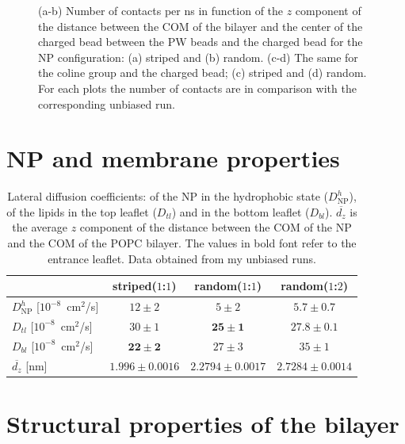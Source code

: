 \begin{figure}[p]
{	}
	\caption{(a-b) Number of contacts per ns in function of the $z$ component of the distance between the \acs{COM} of the bilayer and the center of the charged bead between the \acs{PW} beads and the charged bead for the \acs{NP} configuration: (a) striped and (b) random. (c-d) The same for the coline group and the charged bead; (c) striped and (d) random. For each plots the number of contacts are in comparison with the corresponding unbiased run.}
\end{figure}


\section{NP and membrane properties}

\begin{table}[h!t]
	\centering
	\begin{tabular}{lccc}
		\toprule
		\,		 & striped($1$:$1$)		& random($1$:$1$)		& random($1$:$2$)					\\ \toprule
		$D^h_{\text{NP}}$ [$10^{-8}$~cm$^2$/s] & $12 \pm 2$ & $5 \pm 2$ & $5.7 \pm 0.7$ 				\\ \midrule
		$D_{tl}$ [$10^{-8}$~cm$^2$/s] & $30 \pm 1$ & $\mathbf{25 \pm 1}$ & $\mathbf{27.8 \pm 0.1}$	\\ \midrule
		$D_{bl}$ [$10^{-8}$~cm$^2$/s] & $\mathbf{22 \pm 2}$ & $27 \pm 3$	& $35 \pm 1$			\\ \midrule
		$\overline{d_z}$ [nm] & $1.996 \pm 0.0016$	& $2.2794 \pm 0.0017$	& $2.7284 \pm 0.0014$	\\ \bottomrule
	\end{tabular}
	\caption{Lateral diffusion coefficients: of the \acs{NP} in the hydrophobic state ($D^h_\text{NP}$), of the lipids in the top leaflet ($D_{tl}$) and in the bottom leaflet ($D_{bl}$). $\overline{d_z}$ is the average $z$ component of the distance between the \acs{COM} of the \acs{NP} and the \acs{COM} of the \acs{POPC} bilayer. The values in bold font refer to the entrance leaflet. Data obtained from my unbiased runs.}
	\label{tab:NPMembProperties}
\end{table}


\section{Structural properties of the bilayer}

